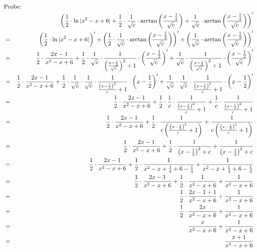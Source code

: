 \documentclass[10pt,a4paper,oneside,ngerman,numbers=noenddot]{scrartcl}
\begin{document}
\begin{alignat*}{2}
\intertext{Probe:}
&& \left(\frac{1}{2} \cdot \ln |x^{2} - x + 6| + \frac{1}{2} \cdot \frac{1}{\sqrt{c}} \cdot \arctan \left(\frac{x - \frac{1}{2}}{\sqrt{c}} \right) + \frac{1}{\sqrt{c}} \cdot \arctan \left(\frac{x - \frac{1}{2}}{\sqrt{c}} \right)\right)' \\
&=& \left(\frac{1}{2} \cdot \ln |x^{2} - x + 6|\right)' + \left(\frac{1}{2} \cdot \frac{1}{\sqrt{c}} \cdot \arctan \left(\frac{x - \frac{1}{2}}{\sqrt{c}} \right)\right)' + \left(\frac{1}{\sqrt{c}} \cdot \arctan \left(\frac{x - \frac{1}{2}}{\sqrt{c}} \right)\right)' \\
&=& \frac{1}{2} \cdot \frac{2x - 1}{x^{2} - x + 6} + \frac{1}{2} \cdot \frac{1}{\sqrt{c}} \cdot \frac{1}{\left(\frac{x - \frac{1}{2}}{\sqrt{c}} \right)^{2} + 1} \cdot \left(\frac{x - \frac{1}{2}}{\sqrt{c}} \right)' + \frac{1}{\sqrt{c}} \cdot \frac{1}{\left(\frac{x - \frac{1}{2}}{\sqrt{c}} \right)^{2} + 1} \cdot \left(\frac{x - \frac{1}{2}}{\sqrt{c}} \right)' \\
&=& \frac{1}{2} \cdot \frac{2x - 1}{x^{2} - x + 6} + \frac{1}{2} \cdot \frac{1}{\sqrt{c}} \cdot \frac{1}{\sqrt{c}} \cdot \frac{1}{\frac{\left(x - \frac{1}{2}\right)^{2}}{c} + 1} \cdot \left(x - \frac{1}{2}\right)' + \frac{1}{\sqrt{c}} \cdot \frac{1}{\sqrt{c}} \cdot \frac{1}{\frac{\left(x - \frac{1}{2}\right)^{2}}{c} + 1} \cdot \left(x - \frac{1}{2}\right)' \\
&=& \frac{1}{2} \cdot \frac{2x - 1}{x^{2} - x + 6} + \frac{1}{2} \cdot \frac{1}{c} \cdot \frac{1}{\frac{\left(x - \frac{1}{2}\right)^{2}}{c} + 1} + \frac{1}{c} \cdot \frac{1}{\frac{\left(x - \frac{1}{2}\right)^{2}}{c} + 1} \\
&=& \frac{1}{2} \cdot \frac{2x - 1}{x^{2} - x + 6} + \frac{1}{2} \cdot \frac{1}{c\left(\frac{\left(x - \frac{1}{2}\right)^{2}}{c} + 1\right)} + \frac{1}{c\left(\frac{\left(x - \frac{1}{2}\right)^{2}}{c} + 1\right)} \\
&=& \frac{1}{2} \cdot \frac{2x - 1}{x^{2} - x + 6} + \frac{1}{2} \cdot \frac{1}{\left(x - \frac{1}{2}\right)^{2} + c} + \frac{1}{\left(x - \frac{1}{2}\right)^{2} + c} \\
&=& \frac{1}{2} \cdot \frac{2x - 1}{x^{2} - x + 6} + \frac{1}{2} \cdot \frac{1}{x^{2} - x + \frac{1}{4} + 6 - \frac{1}{4}} + \frac{1}{x^{2} - x + \frac{1}{4} + 6 - \frac{1}{4}} \\
&=& \frac{1}{2} \cdot \frac{2x - 1}{x^{2} - x + 6} + \frac{1}{2} \cdot \frac{1}{x^{2} - x + 6} + \frac{1}{x^{2} - x + 6} \\
&=& \frac{1}{2} \cdot \frac{2x - 1 + 1}{x^{2} - x + 6} + \frac{1}{x^{2} - x + 6} \\
&=& \frac{1}{2} \cdot \frac{2x}{x^{2} - x + 6} + \frac{1}{x^{2} - x + 6} \\
&=& \frac{x}{x^{2} - x + 6} + \frac{1}{x^{2} - x + 6} \\
&=& \frac{x + 1}{x^{2} - x + 6}
\end{alignat*}
\end{document}
